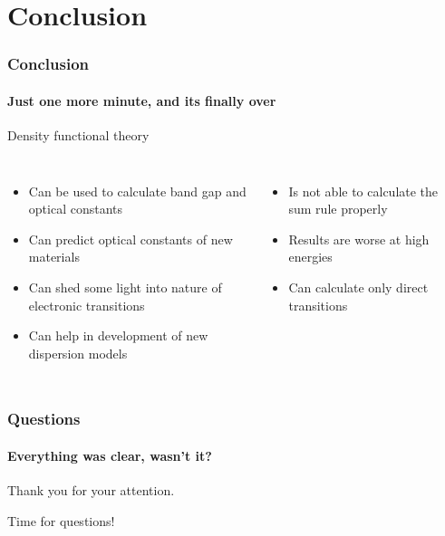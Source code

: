 \documentclass{beamer}
\begin{document}
\section{Conclusion}
\begin{frame}
    \frametitle{Conclusion}
    \framesubtitle{Just one more minute, and its finally over}
	\begin{center}Density functional theory\end{center}
	\begin{columns}[c]
	\begin{itemize}
	\item Can be used to calculate band gap and optical constants 

	\item Can predict optical constants of new materials

	\item Can shed some light into nature of electronic transitions

	\item Can help in development of new dispersion models
	\end{itemize}


	\begin{itemize}
	\item Is not able to calculate the sum rule properly

	\item Results are worse at high energies

	\item Can calculate only direct transitions

	\end{itemize}
	\end{columns}
\end{frame}

\begin{frame}
    \frametitle{Questions}
    \framesubtitle{Everything was clear, wasn't it?}

	\begin{center}
	Thank you for your attention.
	\end{center}
	\begin{center}
	Time for questions!
	\end{center}

\end{frame}
\end{document}
